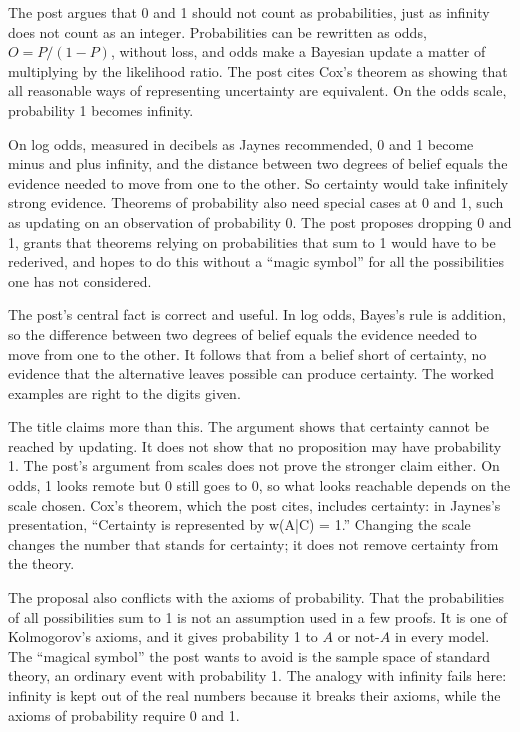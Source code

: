 \begin{afterword}
\summaryhead

The post argues that 0 and 1 should not count as probabilities, just as infinity does not count as an integer. Probabilities can be rewritten as odds, $O = P/(1-P)$, without loss, and odds make a Bayesian update a matter of multiplying by the likelihood ratio. The post cites Cox's theorem as showing that all reasonable ways of representing uncertainty are equivalent. On the odds scale, probability 1 becomes infinity.

On log odds, measured in decibels as Jaynes recommended, 0 and 1 become minus and plus infinity, and the distance between two degrees of belief equals the evidence needed to move from one to the other. So certainty would take infinitely strong evidence. Theorems of probability also need special cases at 0 and 1, such as updating on an observation of probability 0. The post proposes dropping 0 and 1, grants that theorems relying on probabilities that sum to 1 would have to be rederived, and hopes to do this without a ``magic symbol'' for all the possibilities one has not considered.

\responsehead

The post's central fact is correct and useful. In log odds, Bayes's rule is addition, so the difference between two degrees of belief equals the evidence needed to move from one to the other. It follows that from a belief short of certainty, no evidence that the alternative leaves possible can produce certainty. The worked examples are right to the digits given.

The title claims more than this. The argument shows that certainty cannot be reached by updating. It does not show that no proposition may have probability 1. The post's argument from scales does not prove the stronger claim either. On odds, 1 looks remote but 0 still goes to 0, so what looks reachable depends on the scale chosen. Cox's theorem, which the post cites, includes certainty: in Jaynes's presentation, ``Certainty is represented by w(A|C) = 1.'' Changing the scale changes the number that stands for certainty; it does not remove certainty from the theory.

The proposal also conflicts with the axioms of probability. That the probabilities of all possibilities sum to 1 is not an assumption used in a few proofs. It is one of Kolmogorov's axioms, and it gives probability 1 to $A$ or not-$A$ in every model. The ``magical symbol'' the post wants to avoid is the sample space of standard theory, an ordinary event with probability 1. The analogy with infinity fails here: infinity is kept out of the real numbers because it breaks their axioms, while the axioms of probability require 0 and 1.


\end{afterword}
